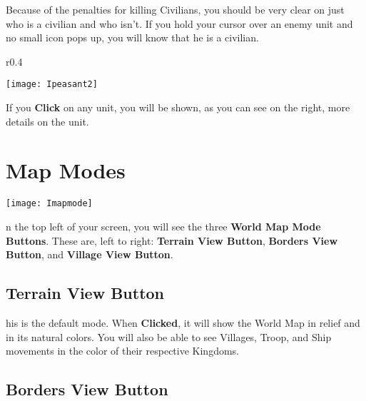 
Because of the penalties for killing Civilians, you should be very clear on just who is a civilian and who isn’t. If you hold your cursor over an enemy unit and no small icon pops up, you will know that he is a civilian.

\begin{wrapfigure}{r}{0.4\textwidth}
\vspace{-20pt}
	\begin{center}
		\texttt{[image: Ipeasant2]} %
\end{center}
\vspace{-20pt}
\end{wrapfigure}

If you \textbf{Click} on any unit, you will be shown, as you can see on the right, more details on the unit. \\

\section{Map Modes}


\begin{center}
	\texttt{[image: Imapmode]} %
\end{center}

n the top left of your screen, you will see the three \textbf{World Map Mode Buttons}. These are, left to right: \textbf{Terrain View Button}, \textbf{Borders View Button}, and \textbf{Village View Button}.

\subsection{Terrain View Button}


his is the default mode. When \textbf{Clicked}, it will show the World Map in relief and in its natural colors. You will also be able to see Villages, Troop, and Ship movements in the color of their respective Kingdoms.

\subsection{Borders View Button}


